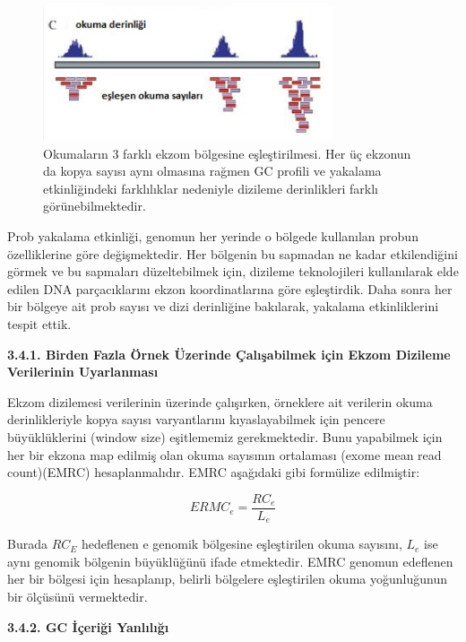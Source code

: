 \documentclass[11pt]{article}
\begin{document}
\begin{figure}[htb]
\begin{center}
  \includegraphics[scale=0.75]{exomedepth.png}
\end{center}
\caption{Okumaların 3 farklı ekzom bölgesine eşleştirilmesi. Her üç ekzonun da kopya sayısı aynı olmasına rağmen GC profili ve yakalama etkinliğindeki farklılıklar nedeniyle dizileme derinlikleri farklı görünebilmektedir.}
\label{fig:exomedepth}
\end{figure}

 Prob yakalama etkinliği, genomun her yerinde o bölgede kullanılan probun özelliklerine göre değişmektedir. Her bölgenin bu sapmadan ne kadar etkilendiğini görmek ve bu sapmaları düzeltebilmek için, dizileme teknolojileri kullanılarak elde edilen DNA parçacıklarını ekzon koordinatlarına göre eşleştirdik. Daha sonra her bir bölgeye ait prob sayısı ve dizi derinliğine bakılarak, yakalama etkinliklerini tespit ettik. 

{\bf 3.4.1. Birden Fazla Örnek Üzerinde Çalışabilmek için Ekzom Dizileme Verilerinin Uyarlanması}

Ekzom dizilemesi verilerinin üzerinde çalışırken, örneklere ait verilerin okuma derinlikleriyle kopya sayısı varyantlarını kıyaslayabilmek için pencere büyüklüklerini (window size) eşitlememiz gerekmektedir. Bunu yapabilmek için her bir ekzona map edilmiş olan okuma sayısının ortalaması (exome mean read count)(EMRC) hesaplanmalıdır. EMRC aşağıdaki gibi formülize edilmiştir:

\[ERMC_e = \frac{RC_e}{L_e}\]

Burada $RC_E$ hedeflenen e genomik bölgesine eşleştirilen okuma sayısını, $L_e$ ise aynı genomik bölgenin büyüklüğünü ifade etmektedir. EMRC genomun edeflenen her bir bölgesi için hesaplanıp, belirli bölgelere eşleştirilen okuma yoğunluğunun bir ölçüsünü vermektedir. 

{\bf 3.4.2. GC İçeriği Yanlılığı}
\end{document}
